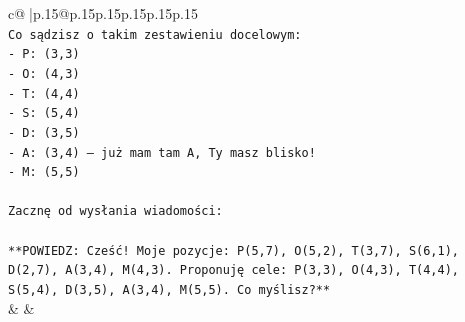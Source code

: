 \documentclass{article}
\begin{document}
{\begin{supertabular}{c@{$\;$}|p{.15\linewidth}@{}p{.15\linewidth}p{.15\linewidth}p{.15\linewidth}p{.15\linewidth}p{.15\linewidth}}
{{{\\ 
\texttt{Co sądzisz o takim zestawieniu docelowym:} \\
\texttt{{-} P: (3,3)} \\
\texttt{{-} O: (4,3)} \\
\texttt{{-} T: (4,4)} \\
\texttt{{-} S: (5,4)} \\
\texttt{{-} D: (3,5)} \\
\texttt{{-} A: (3,4) – już mam tam A, Ty masz blisko!} \\
\texttt{{-} M: (5,5)} \\
\\ 
\texttt{Zacznę od wysłania wiadomości:} \\
\\ 
\texttt{**POWIEDZ: Cześć! Moje pozycje: P(5,7), O(5,2), T(3,7), S(6,1), D(2,7), A(3,4), M(4,3). Proponuję cele: P(3,3), O(4,3), T(4,4), S(5,4), D(3,5), A(3,4), M(5,5). Co myślisz?**} \\
            }
        }
    }
    & & \\ \\


\end{supertabular}}
\end{document}
